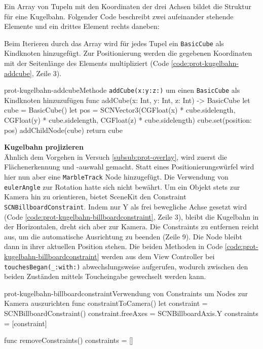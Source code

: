 \begin{description}
	Ein Array von Tupeln mit den Koordinaten der drei Achsen bildet die Struktur für eine Kugelbahn. Folgender Code beschreibt zwei aufeinander stehende Elemente und ein drittes Element rechts daneben:

	Beim Iterieren durch das Array wird für jedes Tupel ein \texttt{BasicCube} als Kindknoten hinzugefügt. Zur Positionierung werden die gegebenen Koordinaten mit der Seitenlänge des Elements multipliziert (Code \ref{code:prot-kugelbahn-addcube}, Zeile 3).

	\begin{code}{prot-kugelbahn-addcube}{Methode \texttt{addCube(x:y:z:)} um einen \texttt{BasicCube} als Kindknoten hinzuzufügen}
		func addCube(x: Int, y: Int, z: Int) -> BasicCube {
			let cube = BasicCube()
			let pos = SCNVector3(CGFloat(x) * cube.sidelength, CGFloat(y) * cube.sidelength, CGFloat(z) * cube.sidelength)
			cube.set(position: pos)
			addChildNode(cube)
			return cube
		}
	\end{code}

	\textbf{Kugelbahn projizieren}\\
	Ähnlich dem Vorgehen in Versuch \ref{subsub:prot-overlay}, wird zuerst die Flächenerkennung und -auswahl gemacht. Statt eines Positionierungswürfel wird hier nun aber eine \texttt{MarbleTrack} Node hinzugefügt. Die Verwendung von \texttt{eulerAngle} zur Rotation hatte sich nicht bewährt. Um ein Objekt stets zur Kamera hin zu orientieren, bietet SceneKit den Constraint \texttt{SCNBillboardConstraint}. Indem nur Y als frei bewegliche Achse gesetzt wird (Code \ref{code:prot-kugelbahn-billboardconstraint}, Zeile 3), bleibt die Kugelbahn in der Horizontalen, dreht sich aber zur Kamera. Die Constraints zu entfernen reicht aus, um die automatische Ausrichtung zu beenden (Zeile 9). Die Node bleibt dann in ihrer aktuellen Position stehen. Die beiden Methoden in Code \ref{code:prot-kugelbahn-billboardconstraint} werden aus dem View Controller bei \texttt{touchesBegan(\_:with:)} abwechslungsweise aufgerufen, wodurch zwischen den beiden Zuständen mittels Toucheingabe gewechselt werden kann.

	\begin{code}{prot-kugelbahn-billboardconstraint}{Verwendung von Constraints um Nodes zur Kamera auszurichten}
		func constraintToCamera() {
			let constraint = SCNBillboardConstraint()
			constraint.freeAxes = SCNBillboardAxis.Y
			constraints = [constraint]
		}
    
		func removeConstraints() {
			constraints = []
		}
	\end{code}


\end{description}

